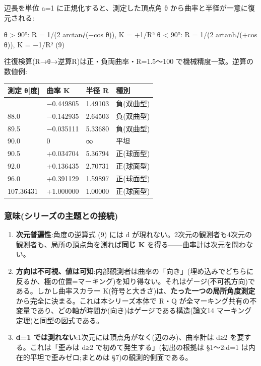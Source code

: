 \documentclass[
]{ltjsarticle}
\newcounter{none} %
\begin{document}
辺長を単位 a=1 に正規化すると、測定した頂点角 θ
から曲率と半径が一意に復元される:

θ \textgreater{} 90°: R = 1/(2 arctan√(−cos θ)), K = +1/R² θ \textless{}
90°: R = 1/(2 artanh√(+cos θ)), K = −1/R² (9)

往復検算(R→θ→逆算R)は正・負両曲率・R=1.5〜100
で機械精度一致。逆算の数値例:

{\def\LTcaptype{none} %
\begin{longtable}[]{@{}llll@{}}
\toprule\noalign{}
測定 θ{[}度{]} & 曲率 K & 半径 R & 種別 \\
\midrule\noalign{}
\endhead
\bottomrule\noalign{}
\endlastfoot
84.0 & −0.449805 & 1.49103 & 負(双曲型) \\
88.0 & −0.142935 & 2.64503 & 負(双曲型) \\
89.5 & −0.035111 & 5.33680 & 負(双曲型) \\
90.0 & 0 & ∞ & 平坦 \\
90.5 & +0.034704 & 5.36794 & 正(球面型) \\
92.0 & +0.136435 & 2.70731 & 正(球面型) \\
96.0 & +0.391129 & 1.59897 & 正(球面型) \\
107.36431 & +1.000000 & 1.00000 & 正(球面型) \\
\end{longtable}
}

\subsubsection{意味(シリーズの主題との接続)}\label{ux610fux5473ux30b7ux30eaux30fcux30baux306eux4e3bux984cux3068ux306eux63a5ux7d9a}

\begin{enumerate}
\def\labelenumi{(\roman{enumi})}
\item
  \textbf{次元普遍性}:角度の逆算式 (9) には d
  が現れない。2次元の観測者も4次元の観測者も、局所の頂点角を測れば\textbf{同じ
  K} を得る------曲率計は次元を問わない。
\item
  \textbf{方向は不可視、値は可知}:内部観測者は曲率の「向き」(埋め込みでどちらに反るか、極の位置=マーキング)を知り得ない。それはゲージ(不可視方向)である。しかし曲率スカラー
  K(符号と大きさ)は、\textbf{たった一つの局所角度測定}から完全に決まる。これは本シリーズ本体で
  R・Q
  が全マーキング共有の不変量であり、どの軸が時間か(向き)はゲージである構造(論文14
  マーキング定理)と同型の図式である。
\item
  \textbf{d=1 では測れない}:1次元には頂点角がなく(辺のみ)、曲率計は d≥2
  を要する。これは「歪みは d≥2 で初めて発生する」(初出の根拠は §1〜2:d=1
  は内在的平坦で歪みゼロ;まとめは §7)の観測的側面である。
\end{enumerate}
\end{document}
